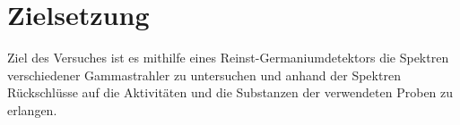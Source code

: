 
\section{Zielsetzung}
\label{sec:Zielsetzung}
Ziel des Versuches ist es mithilfe eines Reinst-Germaniumdetektors die Spektren verschiedener Gammastrahler zu untersuchen und anhand der Spektren Rückschlüsse auf die Aktivitäten und die Substanzen der verwendeten Proben zu erlangen.
